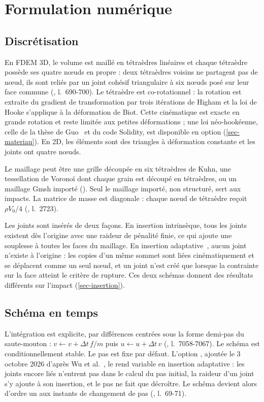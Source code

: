 \section{Formulation numérique}
\label{sec-formulation}

\subsection{Discrétisation}

En FDEM 3D, le volume est maillé en tétraèdres linéaires et chaque tétraèdre possède ses quatre nœuds en propre : deux tétraèdres voisins ne partagent pas de nœud, ils sont reliés par un joint cohésif triangulaire à six nœuds posé sur leur face commune (, l.~690-700). Le tétraèdre est co-rotationnel : la rotation est extraite du gradient de transformation par trois itérations de Higham et la loi de Hooke s'applique à la déformation de Biot. Cette cinématique est exacte en grande rotation et reste limitée aux petites déformations ; une loi néo-hookéenne, celle de la thèse de Guo~\cite{guo2014thesis} et du code Solidity, est disponible en option (\cref{sec-materiau}). En 2D, les éléments sont des triangles à déformation constante et les joints ont quatre nœuds.

Le maillage peut être une grille découpée en six tétraèdres de Kuhn, une tessellation de Voronoï dont chaque grain est découpé en tétraèdres, ou un maillage Gmsh importé (). Seul le maillage importé, non structuré, sert aux impacts. La matrice de masse est diagonale : chaque nœud de tétraèdre reçoit $\rho V_0/4$ (, l.~2723).

Les joints sont insérés de deux façons. En insertion intrinsèque, tous les joints existent dès l'origine avec une raideur de pénalité finie, ce qui ajoute une souplesse à toutes les faces du maillage. En insertion adaptative~\cite{yan2023adaptive}, aucun joint n'existe à l'origine : les copies d'un même sommet sont liées cinématiquement et se déplacent comme un seul nœud, et un joint n'est créé que lorsque la contrainte sur la face atteint le critère de rupture. Ces deux schémas donnent des résultats différents sur l'impact (\cref{sec-insertion}).

\subsection{Schéma en temps}

L'intégration est explicite, par différences centrées sous la forme demi-pas du saute-mouton : $v \leftarrow v + \Delta t\, f/m$ puis $u \leftarrow u + \Delta t\, v$ (, l.~7058-7067). Le schéma est conditionnellement stable. Le pas est fixe par défaut. L'option , ajoutée le 3 octobre 2026 d'après Wu et al.~\cite{wu2024dt}, le rend variable en insertion adaptative : les joints encore liés n'entrent pas dans le calcul du pas initial, la raideur d'un joint s'y ajoute à son insertion, et le pas ne fait que décroître. Le schéma devient alors d'ordre un aux instants de changement de pas (, l.~69-71).

